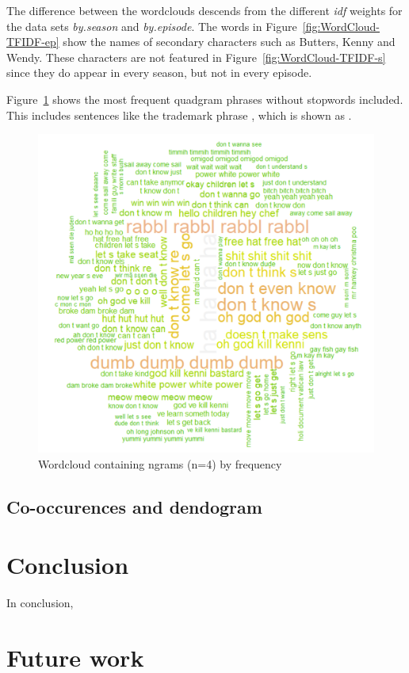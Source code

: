 \documentclass[10pt,a4paper]{article}
\begin{document}
		The difference between the wordclouds descends from the different \textit{idf} weights for the data sets \textit{by.season} and \textit{by.episode}. The words in Figure~\ref{fig:WordCloud-TFIDF-ep} show the names of secondary characters such as Butters, Kenny and Wendy. These characters are not featured in Figure~\ref{fig:WordCloud-TFIDF-s} since they do appear in every season, but not in every episode.
		
		Figure~\ref{fig:WordCloud-ngram} shows the most frequent quadgram phrases without stopwords included. This includes sentences like the trademark phrase , which is shown as .

	\begin{figure}[h]
	\centering
	\includegraphics[scale=0.6]{images/WordCloud-ngram.png}
	\caption{Wordcloud containing ngrams (n=4) by frequency}
	\label{fig:WordCloud-ngram}
	\end{figure}	
	
	\subsection{Co-occurences and dendogram}
	
	\section{Conclusion}
	In conclusion, 

	\section{Future work}
\end{document}
